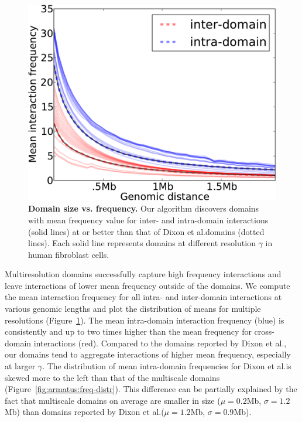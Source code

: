 \documentclass[12pt]{cmuthesis}
\begin{document}

  \begin{figure}[ht!]
      \centering
      \includegraphics[width=0.6\linewidth]{figures/imr90-inter-intra-all-chromos}
      \caption{\textbf{Domain size vs. frequency.} Our algorithm discovers domains with mean frequency value for inter- and intra-domain interactions (solid lines) at or better than that of Dixon et al.\@ domains (dotted lines). Each solid line represents domains at different resolution $\gamma$ in human fibroblast cells.}
      \label{fig:armatus:size-freq}
  \end{figure}


  Multiresolution domains successfully capture high frequency interactions and leave interactions of lower mean frequency outside of the domains. We compute the mean interaction frequency for all intra- and inter-domain interactions at various genomic lengths and plot the distribution of means for multiple resolutions (Figure~\ref{fig:armatus:size-freq}). The mean intra-domain interaction frequency (blue) is consistently and up to two times higher than the mean frequency for cross-domain interactions (red). Compared to the domains reported by Dixon et al., our domains tend to aggregate interactions of higher mean frequency, especially at larger $\gamma$. The distribution of mean intra-domain frequencies for Dixon et al.\@ is skewed more to the left than that of the multiscale domains (Figure~\ref{fig:armatus:freq-distr}). This difference can be partially explained by the fact that multiscale domains on average are smaller in size ($\mu=0.2$Mb, $\sigma=1.2$Mb) than domains reported by Dixon et al.\@ ($\mu=1.2$Mb, $\sigma=0.9$Mb).
\end{document}
